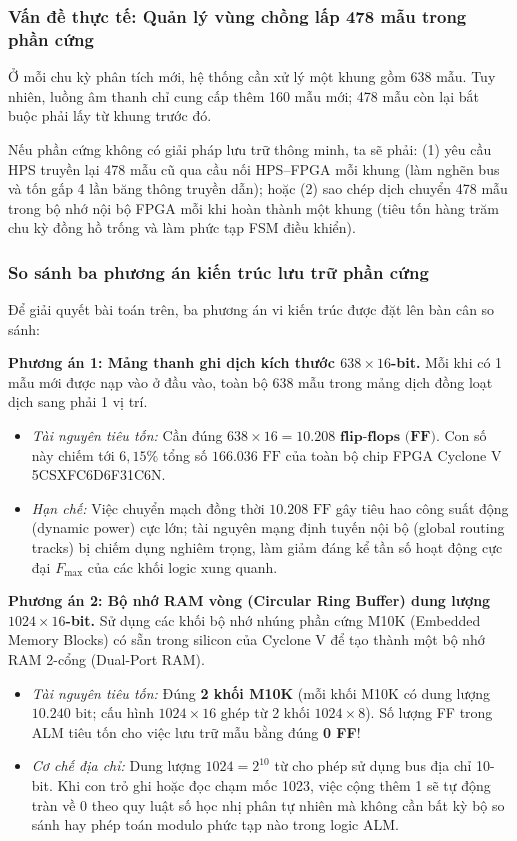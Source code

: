 \subsubsection*{Vấn đề thực tế: Quản lý vùng chồng lấp 478 mẫu trong phần cứng}
Ở mỗi chu kỳ phân tích mới, hệ thống cần xử lý một khung gồm 638 mẫu. Tuy nhiên, luồng âm thanh chỉ cung cấp thêm 160 mẫu mới; 478 mẫu còn lại bắt buộc phải lấy từ khung trước đó. 

Nếu phần cứng không có giải pháp lưu trữ thông minh, ta sẽ phải: (1) yêu cầu HPS truyền lại 478 mẫu cũ qua cầu nối HPS--FPGA mỗi khung (làm nghẽn bus và tốn gấp 4 lần băng thông truyền dẫn); hoặc (2) sao chép dịch chuyển 478 mẫu trong bộ nhớ nội bộ FPGA mỗi khi hoàn thành một khung (tiêu tốn hàng trăm chu kỳ đồng hồ trống và làm phức tạp FSM điều khiển).

\subsubsection*{So sánh ba phương án kiến trúc lưu trữ phần cứng}
Để giải quyết bài toán trên, ba phương án vi kiến trúc được đặt lên bàn cân so sánh:

\textbf{Phương án 1: Mảng thanh ghi dịch kích thước $638 \times 16$-bit.}
Mỗi khi có 1 mẫu mới được nạp vào ở đầu vào, toàn bộ 638 mẫu trong mảng dịch đồng loạt dịch sang phải 1 vị trí. 
\begin{itemize}[leftmargin=1.5em, itemsep=2pt]
    \item \emph{Tài nguyên tiêu tốn:} Cần đúng $638 \times 16 = \mathbf{10.208\text{ flip-flops (FF)}}$. Con số này chiếm tới $6{,}15\%$ tổng số $166.036\text{ FF}$ của toàn bộ chip FPGA Cyclone V 5CSXFC6D6F31C6N.
    \item \emph{Hạn chế:} Việc chuyển mạch đồng thời $10.208\text{ FF}$ gây tiêu hao công suất động (dynamic power) cực lớn; tài nguyên mạng định tuyến nội bộ (global routing tracks) bị chiếm dụng nghiêm trọng, làm giảm đáng kể tần số hoạt động cực đại $F_{\max}$ của các khối logic xung quanh.
\end{itemize}

\textbf{Phương án 2: Bộ nhớ RAM vòng (Circular Ring Buffer) dung lượng $1024 \times 16$-bit.}
Sử dụng các khối bộ nhớ nhúng phần cứng M10K (Embedded Memory Blocks) có sẵn trong silicon của Cyclone V để tạo thành một bộ nhớ RAM 2-cổng (Dual-Port RAM).
\begin{itemize}[leftmargin=1.5em, itemsep=2pt]
    \item \emph{Tài nguyên tiêu tốn:} Đúng \textbf{2 khối M10K} (mỗi khối M10K có dung lượng $10.240\text{ bit}$; cấu hình $1024 \times 16$ ghép từ 2 khối $1024 \times 8$). Số lượng FF trong ALM tiêu tốn cho việc lưu trữ mẫu bằng đúng \textbf{0 FF}!
    \item \emph{Cơ chế địa chỉ:} Dung lượng $1024 = 2^{10}$ từ cho phép sử dụng bus địa chỉ 10-bit. Khi con trỏ ghi hoặc đọc chạm mốc 1023, việc cộng thêm 1 sẽ tự động tràn về 0 theo quy luật số học nhị phân tự nhiên mà không cần bất kỳ bộ so sánh hay phép toán modulo phức tạp nào trong logic ALM.
\end{itemize}

